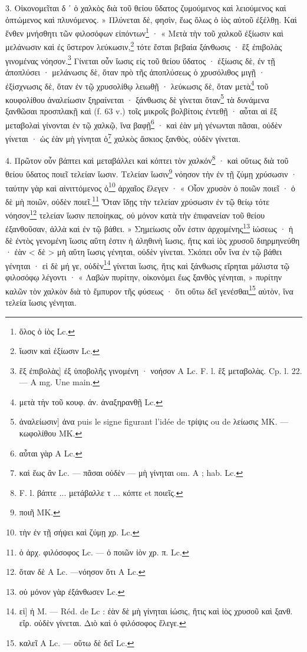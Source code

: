 \documentclass[a4paper, 11pt, oneside, polutonikogreek, french]{article}
\begin{document}
3. Οἰκονομεῖται δ ᾽ ὁ χαλκὸς διὰ τοῦ θείου ὕδατος ζυμούμενος καὶ λειούμενος καὶ ὀπτώμενος καὶ πλυνόμενος. » Πλύνεται δὲ, φησὶν, ἕως ὅλως ὁ ἰὸς αὐτοῦ ἐξέλθῃ. Καὶ ἔνθεν μνήσθητι τῶν φιλοσόφων εἰπόντων\footnote{ὅλος ὁ ἰὸς Lc.} · « Μετὰ τὴν τοῦ χαλκοῦ ἐξίωσιν καὶ μελάνωσιν καὶ ἐς ὕστερον λεύκωσιν,\footnote{ἴωσιν καὶ ἐξίωσιν Lc.} τότε ἔσται βεβαία ξάνθωσις · ἓξ ἐπιβολὰς γινομένας νόησον.\footnote{ἓξ ἐπιβολὰς] ἐξ ὑποβολῆς γινομένη · νοήσον A Lc. F. l. ἓξ μεταβολὰς. Cp. l. 22. --- A mg. Une main.} Γίνεται οὖν ἴωσις εἰς τοῦ θείου ὕδατος · ἐξίωσις δὲ, ἐν τῇ ἀποπλύσει · μελάνωσις δὲ, ὅταν πρὸ τῆς ἀποπλύσεως ὁ χρυσόλιθος μιγῇ · ἐξίσχνωσις δὲ, ὅταν ἐν τῷ χρυσολίθῳ λειωθῇ · λεύκωσις δὲ, ὅταν μετὰ\footnote{μετὰ τὴν τοῦ κουφ. ἀν. ἀναξηρανθῇ Lc.} τοῦ κουφολίθου ἀναλείωσιν ξηραίνεται · ξάνθωσις δὲ γίνεται ὅταν\footnote{ἀναλείωσιν] ἀνα puis le signe figurant l'idée de τρίψις ou de λείωσις MK. --- κωφολίθου MK.} τὰ δυνάμενα ξανθῶσαι προσπλακῇ καὶ (f. 63 v.) τοῖς μικροῖς βολβίτοις ἐντεθῇ · αὗται αἱ ἓξ μεταβολαὶ γίνονται ἐν τῷ χαλκῷ, ἵνα βαφῇ\footnote{αὗται γὰρ A Lc.} · καὶ ἐὰν μὴ γένωνται πᾶσαι, οὐδὲν γίνεται · ὡς ἐὰν μὴ γίνηται ὁ\footnote{καὶ ἕως ἂν Lc. --- πᾶσαι οὐδὲν --- μὴ γίνηται om. A ; hab. Lc.} χαλκὸς ἄσκιος ξανθὸς, οὐδὲν γίνεται.

4. Πρῶτον οὖν βάπτει καὶ μεταβάλλει καὶ κόπτει τὸν χαλκόν\footnote{F. l. βάπτε ... μετάβαλλε τ ... κόπτε et ποιεῖς.} · καὶ οὕτως διὰ τοῦ θείου ὕδατος ποιεῖ τελείαν ἴωσιν. Τελείαν ἴωσιν\footnote{ποιῆ MK.} νόησον τὴν ἐν τῇ ζύμῃ χρύσωσιν · ταύτην γὰρ καὶ αἰνιττόμενος ὁ\footnote{τὴν ἐν τῇ σήψει καὶ ζύμῃ χρ. Lc.} ἀρχαῖος ἔλεγεν · « Οἷον χρυσὸν ὁ ποιῶν ποιεῖ · ὁ δὲ μὴ ποιῶν, οὐδὲν ποιεῖ.\footnote{ὁ ἀρχ. φιλόσοφος Lc. --- ὁ ποιῶν ἰὸν χρ. π. Lc.} Ὅταν ἴδῃς τὴν τελείαν χρύσωσιν ἐν τῷ θείῳ τότε νόησον\footnote{ὅταν δὲ A Lc. ---νόησον ὅτι A Lc.} τελείαν ἴωσιν πεποίηκας, οὐ μόνον κατὰ τὴν ἐπιφανείαν τοῦ θείου ἐξανθοῦσαν, ἀλλὰ καὶ ἐν τῷ βάθει. » Σημείωσις οὖν ἐστιν ἀρχομένης\footnote{οὐ μόνον γὰρ ἐξάνθωσεν Lc.} ἰώσεως · ἡ δὲ ἐντὸς γενομένη ἴωσις αὕτη ἐστιν ἡ ἀληθινὴ ἴωσις, ἥτις καὶ ἰὸς χρυσοῦ διηρμηνεύθη · ἐὰν < δὲ > μὴ αὕτη ἴωσις γένηται, οὐδὲν γίνεται. Σκόπει οὖν ἵνα ἐν τῷ βάθει γένηται · εἰ δὲ μή γε, οὐδὲν\footnote{εἰ] ἡ M. --- Réd. de Lc : ἐὰν δὲ μὴ γίνηται ἰώσις, ἥτις καὶ ἰὸς χρυσοῦ καὶ ξανθ. εἴρ. οὐδὲν γίνεται. Διὸ καὶ ὁ φιλόσοφος ἔλεγε.} γίνεται ἴωσις, ἥτις καὶ ξάνθωσις εἴρηται μάλιστα τῷ φιλοσόφῳ λέγοντι · « Λαβὼν πυρίτην, οἰκονόμει ἕως ξανθὸς γένηται, » πυρίτην καλῶν τὸν χαλκὸν διὰ τὸ ἔμπυρον τῆς φύσεως · ὅτι οὕτω δεῖ γενέσθαι\footnote{καλεῖ A Lc. --- οὕτω δὲ δεῖ Lc.} αὐτὸν, ἵνα τελεία ἴωσις γένηται.
\end{document}
